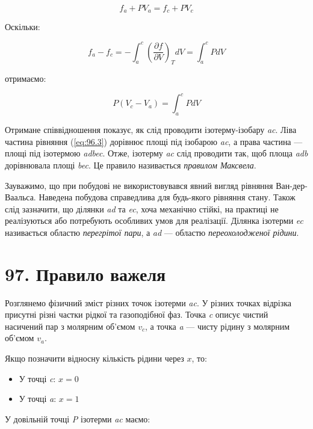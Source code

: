 \documentclass{article}
\begin{document}
\begin{equation}
f_a + PV_a = f_c + PV_c
\label{eq:96.1}
\end{equation}

Оскільки:

\begin{equation}
f_a - f_c = -\int_{a}^{c} \left( \frac{\partial f}{\partial V} \right)_T dV = \int_{a}^{c} P dV
\label{eq:96.2}
\end{equation}

отримаємо:

\begin{equation}
P(V_c - V_a) = \int_{a}^{c} P dV
\label{eq:96.3}
\end{equation}

Отримане співвідношення показує, як слід проводити ізотерму-ізобару \textit{ac}. Ліва частина рівняння
(\ref{eq:96.3}) дорівнює площі під ізобарою \textit{ac}, а права частина — площі під ізотермою
\textit{adbec}. Отже, ізотерму \textit{ac} слід проводити так, щоб площа \textit{adb} дорівнювала
площі \textit{bec}. Це правило називається \emph{правилом Максвела}.

Зауважимо, що при побудові не використовувався явний вигляд рівняння Ван-дер-Ваальса. Наведена
побудова справедлива для будь-якого рівняння стану. Також слід зазначити, що ділянки \textit{ad} та
\textit{ec}, хоча механічно стійкі, на практиці не реалізуються або потребують особливих умов для
реалізації. Ділянка ізотерми \textit{ec} називається областю \emph{перегрітої пари}, а \textit{ad} —
областю \emph{переохолодженої рідини}.

\section*{97. Правило важеля}

Розглянемо фізичний зміст різних точок ізотерми \textit{ac}. У різних точках відрізка присутні різні
частки рідкої та газоподібної фаз. Точка \textit{c} описує чистий насичений пар з молярним об'ємом
$v_c$, а точка \textit{a} — чисту рідину з молярним об'ємом $v_a$.

Якщо позначити відносну кількість рідини через $x$, то:
\begin{itemize}
\item У точці \textit{c}: $x = 0$
\item У точці \textit{a}: $x = 1$
\end{itemize}

У довільній точці \textit{P} ізотерми \textit{ac} маємо:
\end{document}
